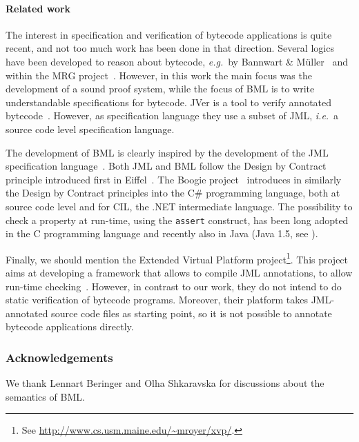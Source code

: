 \paragraph{Related work}
The interest in specification and verification of bytecode
applications is quite recent, and not too much work has been done in
that direction. Several logics have been developed to reason about
bytecode, \emph{e.g.}~by Bannwart \& M\"uller~\cite{BannwartMueller05}
and within the MRG project~\cite{AspinallEtAl:TPHOLs2004}. However, in
this work the main focus was the development of a sound proof system,
while the focus of BML is to write understandable specifications for
bytecode. JVer is a tool to verify annotated
bytecode~\cite{ChanderEILN05}. However, as specification language they
use a subset of JML, \emph{i.e.}\ a source code level specification language.

The development of BML is clearly inspired by the development of the
JML specification language~\cite{JMLReferenceManual05}. Both JML and
BML follow the Design by Contract principle introduced first in
Eiffel~\cite{Meyer97}. The Boogie project~\cite{BarnettCDJL05}
introduces in similarly the Design by Contract principles into the C\#
programming language, both at source code level and for CIL, the .NET
intermediate language.  The possibility to check a property at
run-time, using the \texttt{assert} construct, has been long 
adopted in the C programming language and recently also in Java (Java
1.5, see \cite[\S 14.10]{JLS}). 

Finally, we should mention the Extended Virtual Platform
project\footnote{See
\url{http://www.cs.usm.maine.edu/~mroyer/xvp/}.}. This project aims at
developing a framework that allows to compile JML annotations, to
allow run-time checking~\cite{AlagicXVP05}. However, in contrast to
our work, they do not intend to do static verification of bytecode
programs. Moreover, their platform takes JML-annotated source code
files as starting point, so it is not possible to annotate bytecode
applications directly.

\vspace*{-.5em}
\subsubsection*{Acknowledgements}
We thank Lennart Beringer and Olha Shkaravska for discussions about
the semantics of BML. 
